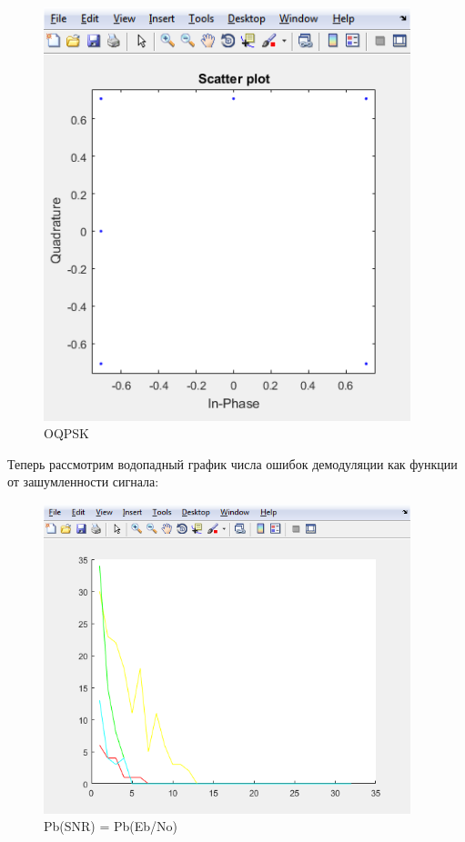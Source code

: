 \documentclass[a4paper,14pt]{extarticle}
\begin{document}
\begin{figure}[H]
\centering
\includegraphics[width=0.95\textwidth]{oqpsk}
\captionsetup{justification=centering,margin=1.0cm}
\caption{OQPSK}
\label{sig}
\end{figure}

Теперь рассмотрим водопадный график числа ошибок демодуляции как функции от зашумленности сигнала:

\begin{figure}[H]
\centering
\includegraphics[width=0.95\textwidth]{waterfall}
\captionsetup{justification=centering,margin=1.0cm}
\caption{Pb(SNR) = Pb(Eb/No)}
\label{sig}
\end{figure}
\end{document}
